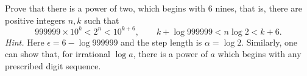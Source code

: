 Prove that there is a power of two, which begins with $6$ nines, that is, there are positive integers $n, k$ such that
\[ 999999 \times 10^k < 2^n < 10^{k+6},\qquad k + \log 999999 < n\log 2 < k + 6. \]
\emph{Hint.} Here $\epsilon = 6 - \log 999999$ and the step length is $\alpha = \log 2$. Similarly, one can show that, for irrational $\log a$, there is a power of $a$ which begins with any prescribed digit sequence.

